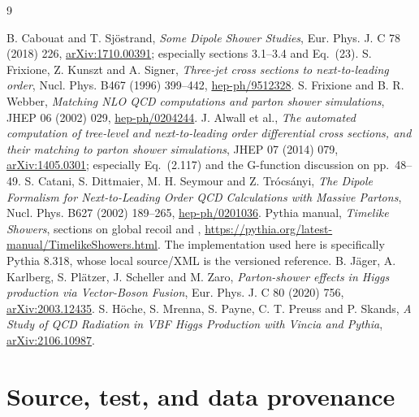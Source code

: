 \documentclass[11pt,a4paper]{article}
\newcommand{\code}[1]{\texttt{\detokenize{#1}}}
\begin{document}
\begin{thebibliography}{9}
B. Cabouat and T. Sj\"ostrand,
\emph{Some Dipole Shower Studies}, Eur. Phys. J. C 78 (2018) 226,
\href{https://arxiv.org/abs/1710.00391}{arXiv:1710.00391};
especially sections 3.1--3.4 and Eq.~(23).
S. Frixione, Z. Kunszt and A. Signer,
\emph{Three-jet cross sections to next-to-leading order},
Nucl. Phys. B467 (1996) 399--442,
\href{https://arxiv.org/abs/hep-ph/9512328}{hep-ph/9512328}.
S. Frixione and B. R. Webber,
\emph{Matching NLO QCD computations and parton shower simulations},
JHEP 06 (2002) 029,
\href{https://arxiv.org/abs/hep-ph/0204244}{hep-ph/0204244}.
J. Alwall et al.,
\emph{The automated computation of tree-level and next-to-leading order
differential cross sections, and their matching to parton shower simulations},
JHEP 07 (2014) 079,
\href{https://arxiv.org/abs/1405.0301}{arXiv:1405.0301};
especially Eq.~(2.117) and the G-function discussion on pp.~48--49.
S. Catani, S. Dittmaier, M. H. Seymour and Z. Tr\'ocs\'anyi,
\emph{The Dipole Formalism for Next-to-Leading Order QCD Calculations with
Massive Partons}, Nucl. Phys. B627 (2002) 189--265,
\href{https://arxiv.org/abs/hep-ph/0201036}{hep-ph/0201036}.
Pythia manual, \emph{Timelike Showers}, sections on global recoil and
\code{TimeShower:recoilDeadCone},
\url{https://pythia.org/latest-manual/TimelikeShowers.html}.
The implementation used here is specifically Pythia 8.318, whose local
source/XML is the versioned reference.
B. J\"ager, A. Karlberg, S. Pl\"atzer, J. Scheller and M. Zaro,
\emph{Parton-shower effects in Higgs production via Vector-Boson Fusion},
Eur. Phys. J. C 80 (2020) 756,
\href{https://arxiv.org/abs/2003.12435}{arXiv:2003.12435}.
S. H\"oche, S. Mrenna, S. Payne, C. T. Preuss and P. Skands,
\emph{A Study of QCD Radiation in VBF Higgs Production with Vincia and Pythia},
\href{https://arxiv.org/abs/2106.10987}{arXiv:2106.10987}.
\end{thebibliography}

\clearpage\appendix
\section{Source, test, and data provenance}\label{app:provenance}
\end{document}
